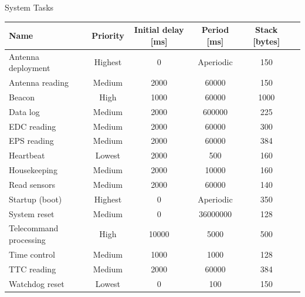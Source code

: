 \begin{frame}{System Tasks}

\begin{table}[!h]\tiny
    \centering
    \label{tab:firmware-tasks}
    \begin{tabular}{lccccc}
        \toprule[1.5pt]
        \textbf{Name}          & \textbf{Priority} & \textbf{Initial delay [ms]} & \textbf{Period [ms]} & \textbf{Stack [bytes]} \\
        \midrule
        Antenna deployment     & Highest & 0      & Aperiodic & 150  \\
        Antenna reading        & Medium  & 2000   & 60000     & 150  \\
        Beacon                 & High    & 1000   & 60000     & 1000 \\
        Data log               & Medium  & 2000   & 600000    & 225  \\
        EDC reading            & Medium  & 2000   & 60000     & 300  \\
        EPS reading            & Medium  & 2000   & 60000     & 384  \\
        Heartbeat              & Lowest  & 2000   & 500       & 160  \\
        Housekeeping           & Medium  & 2000   & 10000     & 160  \\
        Read sensors           & Medium  & 2000   & 60000     & 140  \\
        Startup (boot)         & Highest & 0      & Aperiodic & 350  \\
        System reset           & Medium    & 0    & 36000000  & 128  \\
        Telecommand processing & High    & 10000   & 5000      & 500  \\
        Time control           & Medium  & 1000   & 1000      & 128  \\
        TTC reading            & Medium  & 2000   & 60000     & 384  \\
        Watchdog reset         & Lowest  & 0      & 100       & 150  \\
        \bottomrule[1.5pt]
    \end{tabular}
\end{table}

\end{frame}

